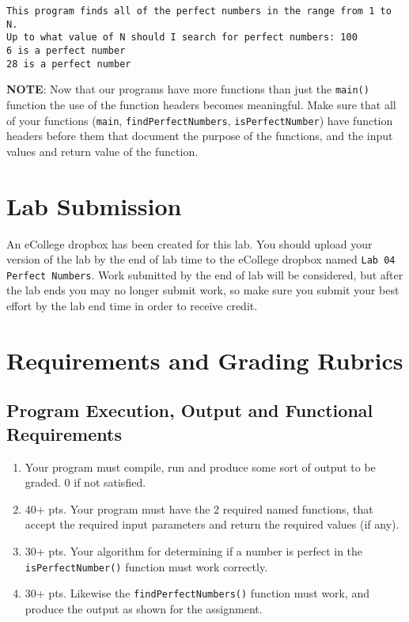 \documentclass[11pt]{article}
\begin{document}
\begin{verbatim}
This program finds all of the perfect numbers in the range from 1 to N.
Up to what value of N should I search for perfect numbers: 100
6 is a perfect number
28 is a perfect number
\end{verbatim}

\textbf{NOTE}: Now that our programs have more functions than just the \verb~main()~
function the use of the function headers becomes meaningful.  Make sure
that all of your functions (\verb~main~, \verb~findPerfectNumbers~, \verb~isPerfectNumber~)
have function headers before them that document the purpose of the
functions, and the input values and return value of the function. 
\section*{Lab Submission}
\label{sec-4}


An eCollege dropbox has been created for this lab.  You should
upload your version of the lab by the end of lab time to the eCollege
dropbox named \verb~Lab 04 Perfect Numbers~.  Work submitted by the end
of lab will be considered, but after the lab ends you may no longer
submit work, so make sure you submit your best effort by the lab end
time in order to receive credit.
\section*{Requirements and Grading Rubrics}
\label{sec-5}
\subsection*{Program Execution, Output and Functional Requirements}
\label{sec-5-1}


\begin{enumerate}
\item Your program must compile, run and produce some sort of output to be
  graded. 0 if not satisfied.
\item 40+ pts.  Your program must have the 2 required named functions, that 
   accept the required input parameters and return the required values
   (if any).
\item 30+ pts. Your algorithm for determining if a number is perfect in the
   \verb~isPerfectNumber()~ function must work correctly.
\item 30+ pts. Likewise the \verb~findPerfectNumbers()~ function must work, and produce
   the output as shown for the assignment.
\end{enumerate}
\end{document}
